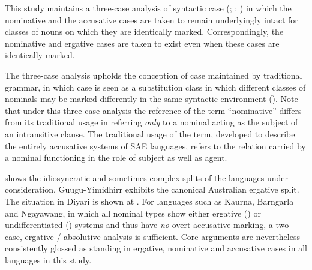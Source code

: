 This study maintains a three-case analysis of syntactic case (\citealt{goddard_case_1982}; \citealt{wilkins_mparntwe_1989}; \citealt[224--226]{nordlinger_constituency_2014}) in which the nominative and the accusative cases are taken to remain underlyingly intact for classes of nouns on which they are identically marked. Correspondingly, the nominative and ergative cases are taken to exist even when these cases are identically marked. 

The three-case analysis upholds the conception of case maintained by traditional grammar, in which case is seen as a substitution class in which different classes of nominals may be marked differently in the same syntactic environment (\citealt{baerman_case_2002}). Note that under this three-case analysis the reference of the term “nominative” differs from its traditional usage in referring \textit{only} to a nominal acting as the subject of an intransitive clause. The traditional usage of the term, developed to describe the entirely accusative systems of SAE languages, refers to the relation carried by a nominal functioning in the role of subject as well as agent. 

 shows the idiosyncratic and sometimes complex splits of the languages under consideration. Guugu{\hyp}Yimidhirr exhibits the canonical Australian ergative split. The situation in Diyari is shown at . For languages such as Kaurna, Barngarla and Ngayawang, in which all nominal types show either ergative () or undifferentiated () systems and thus have \textit{no} overt accusative marking, a two case, ergative / absolutive analysis is sufficient. Core arguments are nevertheless consistently glossed as standing in ergative, nominative and accusative cases in all languages in this study.

